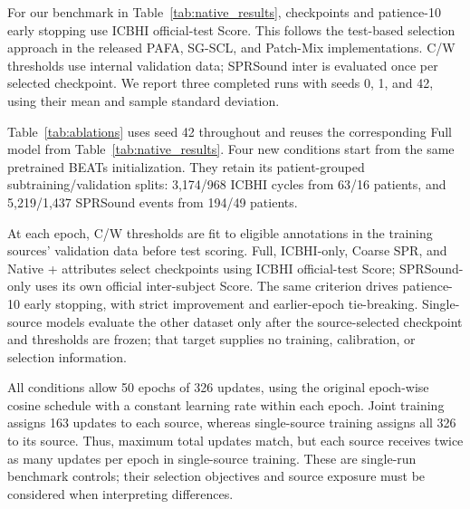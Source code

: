 For our benchmark in Table~\ref{tab:native_results}, checkpoints and
patience-10 early stopping use ICBHI official-test Score. This follows the
test-based selection approach in the released PAFA, SG-SCL, and Patch-Mix
implementations\cite{jeong2025pafa,kim2024sgscl,bae2023patchmix}.
C/W thresholds use internal validation data; SPRSound inter is evaluated
once per selected checkpoint. We report three completed runs with seeds
0, 1, and 42, using their mean and sample standard deviation.

Table~\ref{tab:ablations} uses seed 42 throughout and reuses the
corresponding Full model from Table~\ref{tab:native_results}. Four new
conditions start from the same pretrained BEATs initialization.
They retain its patient-grouped subtraining/validation splits:
3,174/968 ICBHI cycles from 63/16 patients, and 5,219/1,437 SPRSound
events from 194/49 patients.

At each epoch, C/W thresholds are fit to eligible annotations in the
training sources' validation data before test scoring.
Full, ICBHI-only, Coarse SPR, and Native + attributes select checkpoints
using ICBHI official-test Score; SPRSound-only uses its own official
inter-subject Score. The same criterion drives patience-10 early stopping,
with strict improvement and earlier-epoch tie-breaking.
Single-source models evaluate the other dataset only after the source-selected
checkpoint and thresholds are frozen; that target supplies no training,
calibration, or selection information.

All conditions allow 50 epochs of 326 updates, using the original
epoch-wise cosine schedule with a constant learning rate within each epoch.
Joint training assigns 163 updates to each source, whereas single-source
training assigns all 326 to its source. Thus, maximum total updates match,
but each source receives twice as many updates per epoch in single-source
training. These are single-run benchmark controls; their selection objectives
and source exposure must be considered when interpreting differences.

